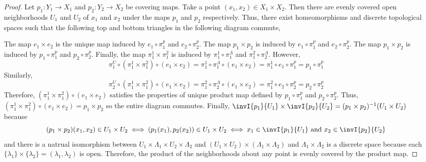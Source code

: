 \documentclass[12pt]{extarticle}
\begin{document}
\begin{proof}
Let $p_1 : Y_1 \to X_1$ and $p_2 : Y_2 \to X_2$ be covering maps. Take a point $(x_1, x_2) \in X_1 \times X_2$. Then there are evenly covered open neighborhoods $U_1$ and $U_2$ of $x_1$ and $x_2$ under the maps $p_1$ and $p_2$ respectively. Thus, there exist homeomorphisms and discrete topological spaces such that the following top and bottom triangles in the following diagram commute,
\begin{center}
\end{center}
The map $e_1 \times e_2$ is the unique map induced by $e_1 \circ \pi_1^p$ and $e_2 \circ \pi_2^p$. The map $p_1 \times p_2$ is induced by $e_1 \circ \pi_1^p$ and $e_2 \circ \pi_2^p$. The map $p_1 \times p_2$ is induced by $p_1 \circ \pi_1^p$ and $p_2 \circ \pi_2^p$. Finally, the map $\pi_1^1 \times \pi_1^2$ is induced by $\pi_1^1 \circ \pi_1^\Lambda$ and $\pi_1^2 \circ \pi_2^\Lambda$. However, \[\pi_1^U \circ (\pi_1^1 \times \pi_1^2) \circ (e_1 \times e_2) = \pi_1^1 \circ \pi_1^\Lambda \circ (e_1 \times e_2) = \pi_1^1 \circ e_1 \circ \pi_1^p = p_1 \circ \pi_1^p\]
Similarly,
\[\pi_2^U \circ (\pi_1^1 \times \pi_1^2) \circ (e_1 \times e_2) = \pi_1^2 \circ \pi_2^\Lambda \circ (e_1 \times e_2) = \pi_1^2 \circ e_2 \circ \pi_2^p = p_2 \circ \pi_2^p\]
Therefore, $(\pi_1^1 \times \pi_1^2) \circ (e_1 \times e_2)$ satisfies the properties of unique product map defined by $p_1 \circ \pi_1^p$ and $p_2 \circ \pi_2^p$. Thus, $(\pi_1^1 \times \pi_1^2) \circ (e_1 \times e_2) = p_1 \times p_2$ so the entire diagram commutes. Finally, $\invI{p_1}{U_1} \times \invI{p_2}{U_2} = (p_1 \times p_2)^{-1}(U_1 \times U_2)$ because \[(p_1 \times p_2)(x_1, x_2) \in U_1 \times U_2 \iff (p_1(x_1), p_2(x_2)) \in U_1 \times U_2 \iff x_1 \in \invI{p_1}{U_1} \text{ and } x_2 \in \invI{p_2}{U_2}\] and there is a natrual isomorphism between $U_1 \times \Lambda_1 \times U_2 \times \Lambda_2$ and $(U_1 \times U_2) \times (\Lambda_1 \times \Lambda_2)$ and $\Lambda_1 \times \Lambda_2$ is a discrete space because each $\{\lambda_1\} \times \{\lambda_2\} = (\lambda_1, \lambda_2)$ is open. Therefore, the product of the neighborhoods about any point is evenly covered by the product map.
\end{proof}
\end{document}
